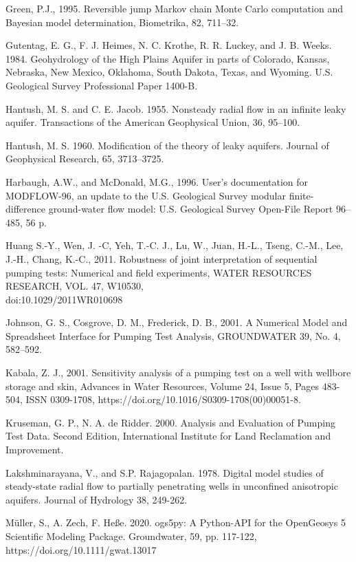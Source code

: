 \documentclass[11pt, a4paper]{article}
\begin{document}
    
    Green, P.J., 1995. Reversible jump Markov chain Monte Carlo computation and Bayesian model determination, Biometrika, 82, 711–32.
    
    
    Gutentag, E. G., F. J. Heimes, N. C. Krothe, R. R. Luckey, and J. B. Weeks. 1984. Geohydrology of the High Plains Aquifer in parts of Colorado, Kansas, Nebraska, New Mexico, Oklahoma, South Dakota, Texas, and Wyoming. U.S. Geological Survey Professional Paper 1400-B.
    
    
    Hantush, M. S. and C. E. Jacob. 1955. Nonsteady radial flow in an infinite leaky aquifer. Transactions of the American Geophysical Union, 36, 95–100.


    Hantush, M. S. 1960. Modification of the theory of leaky aquifers. Journal of Geophysical Research, 65, 3713–3725.

    
    Harbaugh, A.W., and McDonald, M.G., 1996. User’s documentation for MODFLOW-96, an update to the U.S. Geological Survey modular finite-difference ground-water flow model: U.S. Geological Survey Open-File Report 96–485, 56 p.
    
    
    Huang S.-Y., Wen, J. -C, Yeh, T.-C. J., Lu, W., Juan, H.-L., Tseng, C.-M., Lee, J.-H., Chang, K.-C., 2011. Robustness of joint interpretation of sequential pumping tests: Numerical and field experiments, WATER RESOURCES RESEARCH, VOL. 47, W10530, \\doi:10.1029/2011WR010698
    
    Johnson, G. S., Cosgrove, D. M., Frederick, D. B., 2001. A Numerical Model and Spreadsheet Interface for Pumping Test Analysis, GROUNDWATER 39, No. 4, 582–592.

    
    Kabala, Z. J., 2001. Sensitivity analysis of a pumping test on a well with wellbore storage and skin, Advances in Water Resources, Volume 24, Issue 5, Pages 483-504, ISSN 0309-1708, https://doi.org/10.1016/S0309-1708(00)00051-8.

    
    Kruseman, G. P., N. A. de Ridder. 2000. Analysis and Evaluation of Pumping Test Data. Second Edition, International Institute for Land Reclamation and Improvement.
    
    
    Lakshminarayana, V., and S.P. Rajagopalan. 1978. Digital model studies of steady-state radial flow to partially penetrating wells in unconfined anisotropic aquifers. Journal of Hydrology 38, 249-262.

    
    Müller, S., A. Zech, F. Heße. 2020. ogs5py: A Python-API for the OpenGeosys 5 Scientific Modeling Package. Groundwater, 59, pp. 117-122, https://doi.org/10.1111/gwat.13017
    
\end{document}
